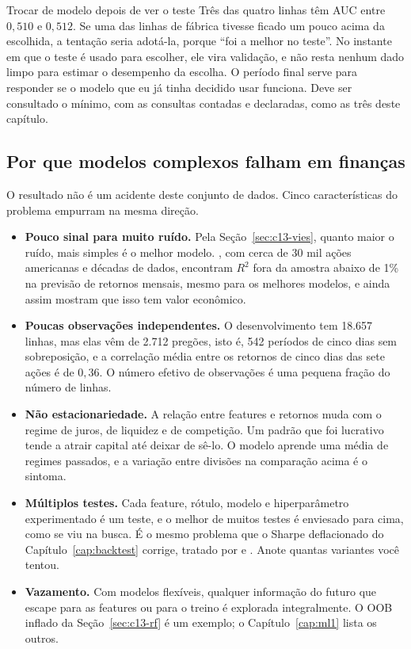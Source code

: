 \begin{armadilha}{Trocar de modelo depois de ver o teste}
Três das quatro linhas têm AUC entre $0,510$ e $0,512$. Se uma das linhas de fábrica tivesse ficado um pouco acima da escolhida, a tentação seria adotá-la, porque ``foi a melhor no teste''. No instante em que o teste é usado para escolher, ele vira validação, e não resta nenhum dado limpo para estimar o desempenho da escolha. O período final serve para responder se o modelo que eu já tinha decidido usar funciona. Deve ser consultado o mínimo, com as consultas contadas e declaradas, como as três deste capítulo.
\end{armadilha}

\subsection{Por que modelos complexos falham em finanças}
\label{sec:c13-falham}

O resultado não é um acidente deste conjunto de dados. Cinco características do problema empurram na mesma direção.

\begin{itemize}
  \item \textbf{Pouco sinal para muito ruído.} Pela Seção~\ref{sec:c13-vies}, quanto maior o ruído, mais simples é o melhor modelo. \citet{gu2020}, com cerca de 30 mil ações americanas e décadas de dados, encontram $R^2$ fora da amostra abaixo de 1\% na previsão de retornos mensais, mesmo para os melhores modelos, e ainda assim mostram que isso tem valor econômico.
  \item \textbf{Poucas observações independentes.} O desenvolvimento tem 18.657 linhas, mas elas vêm de 2.712 pregões, isto é, 542 períodos de cinco dias sem sobreposição, e a correlação média entre os retornos de cinco dias das sete ações é de $0,36$. O número efetivo de observações é uma pequena fração do número de linhas.
  \item \textbf{Não estacionariedade.} A relação entre features e retornos muda com o regime de juros, de liquidez e de competição. Um padrão que foi lucrativo tende a atrair capital até deixar de sê-lo. O modelo aprende uma média de regimes passados, e a variação entre divisões na comparação acima é o sintoma.
  \item \textbf{Múltiplos testes.} Cada feature, rótulo, modelo e hiperparâmetro experimentado é um teste, e o melhor de muitos testes é enviesado para cima, como se viu na busca. É o mesmo problema que o Sharpe deflacionado do Capítulo~\ref{cap:backtest} corrige, tratado por \citet{bailey2014pseudo} e \citet{bailey2014dsr}. Anote quantas variantes você tentou.
  \item \textbf{Vazamento.} Com modelos flexíveis, qualquer informação do futuro que escape para as features ou para o treino é explorada integralmente. O OOB inflado da Seção~\ref{sec:c13-rf} é um exemplo; o Capítulo~\ref{cap:ml1} lista os outros.
\end{itemize}

